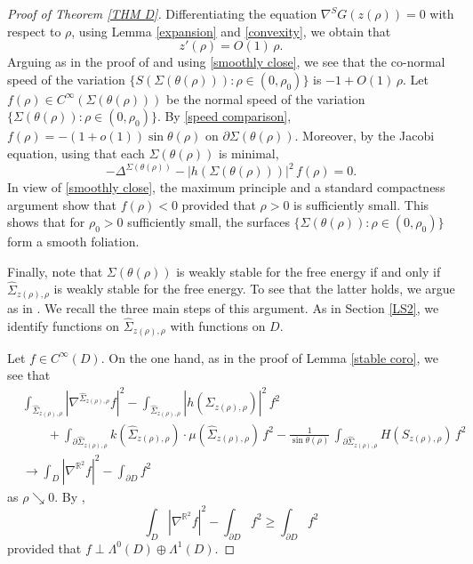\documentclass[11pt]{amsart}
\begin{document}
\begin{proof}[Proof of Theorem \ref{THM D}]
	 Differentiating the equation $\nabla^S G(z(\rho))=0$ with respect to $\rho$, using Lemma \ref{expansion} and \eqref{convexity}, we obtain that 
	$$
	z'(\rho)=O(1)\,\rho.
	$$
	 Arguing as in the proof of \cite[Proposition 49]{largearea} and using \eqref{smoothly close},  
we see that the co-normal speed of the variation	  $\{S(\Sigma(\theta(\rho))) :\rho\in(0,\rho_0)\}$ is  $-1+O(1)\,\rho.$ 	  
	   Let $f(\rho)\in C^\infty(\Sigma(\theta(\rho)))$ be the normal speed of the variation $\{\Sigma(\theta(\rho)):\rho\in(0,\rho_0) \}$. By \eqref{speed comparison}, $f(\rho)=-(1+o(1))\sin\theta(\rho)$ on $\partial \Sigma(\theta(\rho))$. Moreover, by the Jacobi equation, using that each $\Sigma(\theta(\rho))$ is minimal, 
	 $$
	 -\Delta^{\Sigma(\theta(\rho))}-|h(\Sigma(\theta(\rho)))|^2\,f(\rho)=0.
	 $$
	 In view of \eqref{smoothly close}, the maximum principle and a standard compactness argument show that $f(\rho)<0$ provided that $\rho>0$ is  sufficiently small. This shows that for $\rho_0>0$ sufficiently small, the surfaces $\{\Sigma(\theta(\rho)):\rho\in(0,\rho_0) \}$ form a smooth foliation.
	 
	 Finally, note that $\Sigma(\theta(\rho))$ is weakly stable for the free energy if and only if $\hat \Sigma_{z(\rho),\rho}$ is weakly stable for the free energy. To see that the latter holds, we  argue as in \cite[p.~1052--1053]{cmc}. We  recall the three main steps of this argument. As in Section \ref{LS2}, we identify functions on $\hat \Sigma_{z(\rho),\rho}$ with functions on $D$.
	 
Let $f\in C^\infty(D).$	  On the one hand, as in the proof of Lemma \ref{stable coro}, we see that  
	 \begin{equation*} 
	 \begin{aligned} 
	 &	\int_{\hat \Sigma_{z(\rho),\rho}} |\nabla^{\hat \Sigma_{z(\rho),\rho}} f|^2-\int_{\hat \Sigma_{z(\rho),\rho}} |h(\hat \Sigma_{z(\rho),\rho})|^2\,f^2\\&\qquad +\int_{\partial \hat \Sigma_{z(\rho),\rho}} k(\hat \Sigma_{z(\rho),\rho})\cdot\mu(\hat \Sigma_{z(\rho),\rho})\,f^2-\frac{1}{\sin\theta(\rho)}\,\int_{ \partial \hat \Sigma_{z(\rho),\rho}} H(S_{z(\rho),\rho})\,f^2
	 \\&\to  \int_{D}|\nabla^{\mathbb{R}^2} f|^2-\int_{\partial D}f^2
	 \end{aligned}
	 \end{equation*}
	 as $\rho\searrow 0$. By \cite[Example 1.3.1]{Spectralgeometry},
	 $$
	 \int_{D}|\nabla^{\mathbb{R}^2} f|^2-\int_{\partial D}f^2\geq \int_{\partial D} f^2
	 $$
	 provided that $f\perp \Lambda^0(D)\oplus \Lambda^1(D)$.
	 


\end{proof}
\end{document}
